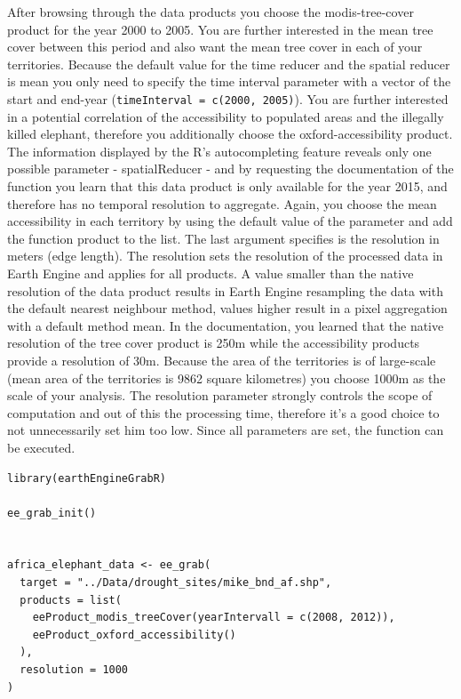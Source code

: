 \documentclass[11pt,twoside,a4paper,final]{report}
\begin{document}
After browsing through the data products you choose the modis-tree-cover product for the year 2000 to 2005. You are further interested in the mean tree cover between this period and also want the mean tree cover in each of your territories. Because the default value for the time reducer and the spatial reducer is mean you only need to specify the time interval parameter with a vector of the start and end-year (\texttt{timeInterval = c(2000, 2005)}). You are further interested in a potential correlation of the accessibility to populated areas and the illegally killed elephant, therefore you additionally choose the oxford-accessibility product. The information displayed by the R's autocompleting feature reveals only one possible parameter - spatialReducer - and by requesting the documentation of the function you learn that this data product is only available for the year 2015, and therefore has no temporal resolution to aggregate. Again, you choose the mean accessibility in each territory by using the default value of the parameter and add the function product to the list. The last argument specifies is the resolution in meters (edge length). The resolution sets the resolution of the processed data in Earth Engine and applies for all products. A value smaller than the native resolution of the data product results in Earth Engine resampling the data with the default nearest neighbour method, values higher result in a pixel aggregation with a default method mean. In the documentation, you learned that the native resolution of the tree cover product is 250m while the accessibility products provide a resolution of 30m. Because the area of the territories is of large-scale (mean area of the territories is 9862 square kilometres) you choose 1000m as the scale of your analysis. The resolution parameter strongly controls the scope of computation and out of this the processing time, therefore it's a good choice to not unnecessarily set him too low. 
Since all parameters are set, the function can be executed. 

\begin{lstlisting}
library(earthEngineGrabR)

ee_grab_init()


africa_elephant_data <- ee_grab(
  target = "../Data/drought_sites/mike_bnd_af.shp",
  products = list(
    eeProduct_modis_treeCover(yearIntervall = c(2008, 2012)),
    eeProduct_oxford_accessibility()
  ),
  resolution = 1000
)
\end{lstlisting}
\end{document}
